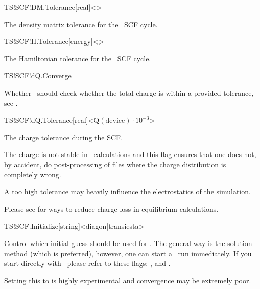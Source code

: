 \begin{fdfentry}{TS!SCF!DM.Tolerance}[real]<>%

  The density matrix tolerance for the \tsiesta\ SCF cycle.

\end{fdfentry}

\begin{fdfentry}{TS!SCF!H.Tolerance}[energy]<>%

  The Hamiltonian tolerance for the \tsiesta\ SCF cycle.

\end{fdfentry}

\begin{fdflogicalT}{TS!SCF!dQ.Converge}

  Whether \tsiesta\ should check whether the total charge is within a
  provided tolerance, see .

\end{fdflogicalT}

\begin{fdfentry}{TS!SCF!dQ.Tolerance}[real]<$\mathrm{Q(device)}\cdot 10^{-3}$>%
  
  The charge tolerance during the SCF.

  The charge is not stable in \tsiesta\ calculations and this flag
  ensures that one does not, by accident, do post-processing of files
  where the charge distribution is completely wrong.

  A too high tolerance may heavily influence the electrostatics of the
  simulation.

  \note Please see  for ways to reduce charge loss in
  equilibrium calculations.

\end{fdfentry}

\begin{fdfentry}{TS!SCF.Initialize}[string]<diagon|transiesta>%

  Control which initial guess should be used for \tsiesta. The general
  way is the  solution method (which is preferred),
  however, one can start a \tsiesta\ run immediately. If you start
  directly with \tsiesta\ please refer to these flags:
  ,  and
  .
  
  \note Setting this to  is highly experimental and
  convergence may be extremely poor.

\end{fdfentry}

